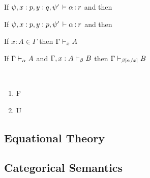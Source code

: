 \begin{theorem}[Exchange]
If $\psi,x:p,y:q,\psi' \, \vdash \mathit{\alpha} \, \mathit{:} \, \mathit{r}$ and 
then 
\end{theorem}

\begin{theorem}[Contraction]
\item If $\psi,x:p,y:p,\psi' \, \vdash \mathit{\alpha} \, \mathit{:} \, \mathit{r}$ and 
then
\end{theorem}

\begin{theorem}[Identity]
If $x:A \in \Gamma$ then $\Gamma \vdash_{x} A$
\end{theorem}

\begin{theorem}[Cut]
If $\Gamma \vdash_{\alpha} A$ and $\Gamma,x:A \vdash_{\beta} B$ 
then $\Gamma \vdash_{\beta[\alpha/x]} B$ 
\end{theorem}

\begin{theorem}[Fusion] ~
\begin{enumerate} 
\item F
\item U
\end{enumerate}
\end{theorem}

\subsection{Equational Theory}

\subsection{Categorical Semantics}

